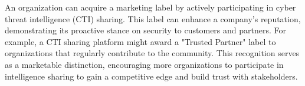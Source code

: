 An organization can acquire a marketing label by actively participating in cyber threat intelligence (CTI) sharing. This label can enhance a company's reputation, demonstrating its proactive stance on security to customers and partners. For example, a CTI sharing platform might award a "Trusted Partner" label to organizations that regularly contribute to the community. This recognition serves as a marketable distinction, encouraging more organizations to participate in intelligence sharing to gain a competitive edge and build trust with stakeholders.